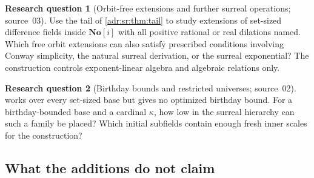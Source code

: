 \documentclass[11pt,letterpaper]{article}
\numberwithin{equation}{section}
\theoremstyle{definition}
\newtheorem{question}{Research question}
\theoremstyle{remark}
\newcommand{\SC}{\mathbf{No}[i]}
\begin{document}
\begin{question}[Orbit-free extensions and further surreal operations; source~03]
Use the tail of \cref{adr:sr:thm:tail} to study extensions of set-sized
difference fields inside $\SC$ with all positive rational or real dilations
named. Which free orbit extensions can also satisfy prescribed conditions
involving Conway simplicity, the natural surreal derivation, or the surreal
exponential? The construction controls exponent-linear algebra and algebraic
relations only.
\end{question}

\begin{question}[Birthday bounds and restricted universes; source~02]
\label{adr:sr:q:birthday}
 works over every set-sized base but gives no optimized
birthday bound. For a birthday-bounded base and a cardinal $\kappa$, how low in
the surreal hierarchy can such a family be placed? Which initial subfields
contain enough fresh inner scales for the construction?
\end{question}

\subsection{What the additions do not claim}
\label{adr:sr:sec:nonclaims}
\end{document}
